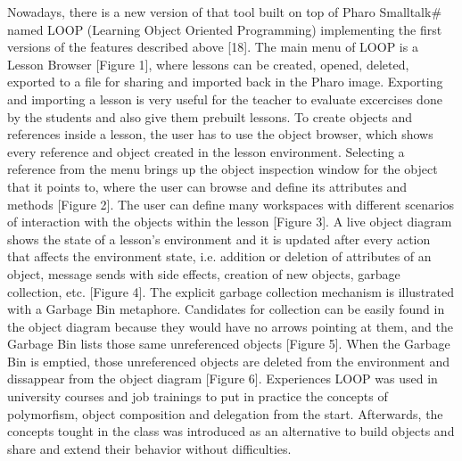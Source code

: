 \documentclass{sigplanconf}
\begin{document}
Nowadays, there is a new version of that tool built on top of Pharo Smalltalk# named LOOP  (Learning Object Oriented Programming) implementing the first versions of the features described above [18].
The main menu of LOOP is a Lesson Browser [Figure 1], where lessons can be created, opened, deleted, exported to a file for sharing and imported back in the Pharo image. Exporting and importing a lesson is very useful for the teacher to evaluate excercises done by the students and also give them prebuilt lessons.
To create objects and references inside a lesson, the user has to use the object browser, which shows every reference and object created in the lesson environment. Selecting a reference from the menu brings up the object inspection window for the object that it points to, where the user can browse and define its attributes and methods [Figure 2]. 
The user can define many workspaces with different scenarios of interaction with the objects within the lesson [Figure 3].
A live object diagram shows the state of a lesson’s environment and it is updated after every action that affects the environment state, i.e. addition or deletion of attributes of an object, message sends with side effects, creation of new objects, garbage collection, etc. [Figure 4]. 
The explicit garbage collection mechanism is illustrated with a Garbage Bin metaphore. Candidates for collection can be easily found in the object diagram because they would have no arrows pointing at them, and the Garbage Bin lists those same unreferenced objects [Figure 5]. When the Garbage Bin is emptied, those unreferenced objects are deleted from the environment and dissappear from the object diagram [Figure 6].
Experiences
LOOP was used in university courses and job trainings to put in practice the concepts of polymorfism, object composition and delegation from the start.  Afterwards, the concepts tought in the class was introduced as an alternative to build objects and share and extend their behavior without difficulties.
\end{document}
